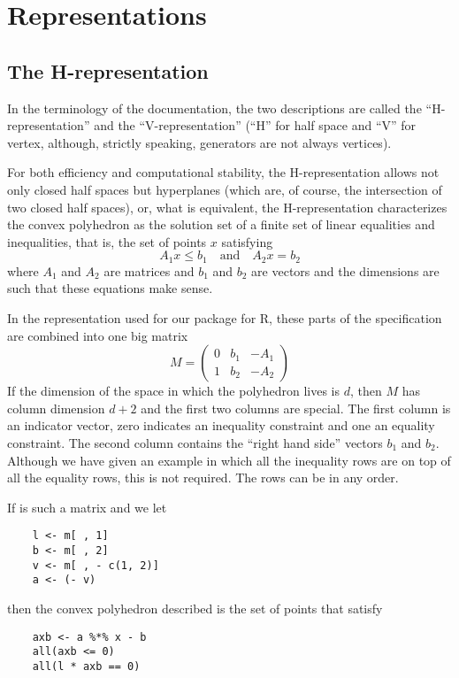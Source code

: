 \documentclass{article}
\begin{document}
\section{Representations}

\subsection{The H-representation}

In the terminology of the \verb@cddlib@ documentation,
the two descriptions are called
the ``H-representation'' and the ``V-representation''
(``H'' for half space and ``V'' for vertex,
although, strictly speaking, generators are not always vertices).

For both efficiency and computational stability, the H-representation
allows not only closed half spaces but hyperplanes (which are, of course, the
intersection of two closed half spaces), or, what is equivalent,
the H-representation characterizes the convex polyhedron as the solution
set of a finite set of linear equalities and inequalities, that is,
the set of points $x$ satisfying
$$
   A_1 x \le b_1 \quad \text{and} \quad A_2 x = b_2
$$
where $A_1$ and $A_2$ are matrices and $b_1$ and $b_2$ are vectors
and the dimensions are such that these equations make sense.

In the representation used for our \verb@rcdd@ package
for R, these parts of the specification are combined into one big matrix
$$
   M = \begin{pmatrix} 0 & b_1 & - A_1 \\ 1 & b_2 & - A_2 \end{pmatrix}
$$
If the dimension of the space in which the polyhedron lives is $d$,
then $M$ has column dimension $d + 2$ and the first two columns are special.
The first column is an indicator vector, zero indicates an inequality
constraint and one an equality constraint.  The second column contains
the ``right hand side'' vectors $b_1$ and $b_2$.  Although we have given
an example in which all the inequality rows are on top of all the equality
rows, this is not required.  The rows can be in any order.

If \verb@m@ is such a matrix and we let
\begin{verbatim}
    l <- m[ , 1]
    b <- m[ , 2]
    v <- m[ , - c(1, 2)]
    a <- (- v)
\end{verbatim}
then the convex polyhedron described is the set of points \verb@x@ that
satisfy
\begin{verbatim}
    axb <- a %*% x - b
    all(axb <= 0)
    all(l * axb == 0)
\end{verbatim}
\end{document}
